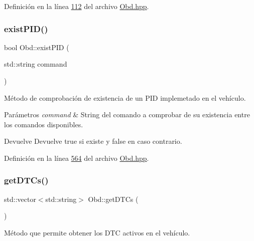 Definición en la línea \hyperlink{Obd_8hpp_source_l00112}{112} del archivo \hyperlink{Obd_8hpp_source}{Obd.\+hpp}.

\mbox{\label{classObd_aeff55ecb0a0a4278a22f20db3d2e17e3}} 
\subsubsection{\texorpdfstring{exist\+P\+I\+D()}{existPID()}}
{\footnotesize\ttfamily bool Obd\+::exist\+P\+ID (\begin{DoxyParamCaption}\item[{std\+::string}]{command }\end{DoxyParamCaption})\hspace{0.3cm}{\ttfamily [inline]}}



Método de comprobación de existencia de un P\+ID implemetado en el vehículo. 


\begin{DoxyParams}{Parámetros}
{\em command} & String del comando a comprobar de su existencia entre los comandos disponibles. \\
\hline
\end{DoxyParams}
\begin{DoxyReturn}{Devuelve}
Devuelve true si existe y false en caso contrario. 
\end{DoxyReturn}


Definición en la línea \hyperlink{Obd_8hpp_source_l00564}{564} del archivo \hyperlink{Obd_8hpp_source}{Obd.\+hpp}.

\mbox{\label{classObd_ac57afb9228d933c6be5b2fa8e6446036}} 
\subsubsection{\texorpdfstring{get\+D\+T\+Cs()}{getDTCs()}}
{\footnotesize\ttfamily std\+::vector$<$std\+::string$>$ Obd\+::get\+D\+T\+Cs (\begin{DoxyParamCaption}{ }\end{DoxyParamCaption})\hspace{0.3cm}{\ttfamily [inline]}}



Método que permite obtener los D\+TC activos en el vehículo. 


